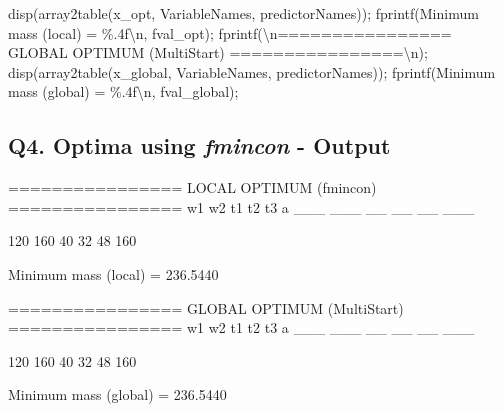 \documentclass[
  letterpaper,
  DIV=11,
  numbers=noendperiod]{scrartcl}
\newenvironment{Shaded}{\begin{snugshade}}{\end{snugshade}}
\newcommand{\AlertTok}[1]{\textcolor[rgb]{0.68,0.00,0.00}{#1}}
\newcommand{\InformationTok}[1]{\textcolor[rgb]{0.37,0.37,0.37}{#1}}
\newcommand{\NormalTok}[1]{\textcolor[rgb]{0.00,0.23,0.31}{#1}}
\newcommand{\OperatorTok}[1]{\textcolor[rgb]{0.37,0.37,0.37}{#1}}
\newcommand{\SpecialStringTok}[1]{\textcolor[rgb]{0.13,0.47,0.30}{#1}}
\newcommand{\VariableTok}[1]{\textcolor[rgb]{0.07,0.07,0.07}{#1}}
\begin{document}
\begin{Shaded}
\begin{Highlighting}[]
\VariableTok{disp}\NormalTok{(}\VariableTok{array2table}\NormalTok{(}\VariableTok{x\_opt}\OperatorTok{,} \SpecialStringTok{\textquotesingle{}VariableNames\textquotesingle{}}\OperatorTok{,} \VariableTok{predictorNames}\NormalTok{))}\OperatorTok{;}
\VariableTok{fprintf}\NormalTok{(}\SpecialStringTok{\textquotesingle{}Minimum mass (local) = \%.4f\textbackslash{}n\textquotesingle{}}\OperatorTok{,} \VariableTok{fval\_opt}\NormalTok{)}\OperatorTok{;}
\VariableTok{fprintf}\NormalTok{(}\SpecialStringTok{\textquotesingle{}\textbackslash{}n================ GLOBAL OPTIMUM (MultiStart) ================\textbackslash{}n\textquotesingle{}}\NormalTok{)}\OperatorTok{;}
\VariableTok{disp}\NormalTok{(}\VariableTok{array2table}\NormalTok{(}\VariableTok{x\_global}\OperatorTok{,} \SpecialStringTok{\textquotesingle{}VariableNames\textquotesingle{}}\OperatorTok{,} \VariableTok{predictorNames}\NormalTok{))}\OperatorTok{;}
\VariableTok{fprintf}\NormalTok{(}\SpecialStringTok{\textquotesingle{}Minimum mass (global) = \%.4f\textbackslash{}n\textquotesingle{}}\OperatorTok{,} \VariableTok{fval\_global}\NormalTok{)}\OperatorTok{;}
\end{Highlighting}
\end{Shaded}

\subsection{\texorpdfstring{Q4. Optima using \textbf{\emph{fmincon}} -
Output}{Q4. Optima using fmincon - Output}}\label{q4.-optima-using-fmincon---output}

\begin{Shaded}
\begin{Highlighting}[]
\NormalTok{==============}\AlertTok{== LOCAL OPTIMUM (fmincon) ==}\NormalTok{==============}
\NormalTok{    w1     w2     t1    t2    t3     a }
\NormalTok{    \_\_\_    \_\_\_    \_\_    \_\_    \_\_    \_\_\_}

\InformationTok{    120    160    40    32    48    160}

\NormalTok{Minimum mass (local) = 236.5440}

\NormalTok{==============}\AlertTok{== GLOBAL OPTIMUM (MultiStart) ==}\NormalTok{==============}
\NormalTok{    w1     w2     t1    t2    t3     a }
\NormalTok{    \_\_\_    \_\_\_    \_\_    \_\_    \_\_    \_\_\_}

\InformationTok{    120    160    40    32    48    160}

\NormalTok{Minimum mass (global) = 236.5440}
\end{Highlighting}
\end{Shaded}
\end{document}
